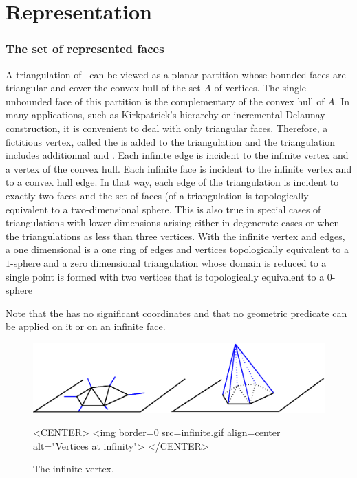 \section{Representation}
\label{Section_2D_Triangulations_Representation}

\subsubsection{The set of represented faces}

A triangulation  of \cgal\ can be viewed as a planar partition 
whose bounded faces are triangular and cover
the convex hull of the set ${  A}$ of vertices. 
The single unbounded face of this partition
is the complementary of the convex hull of ${  A}$. 
In many applications, such as Kirkpatrick's hierarchy
or incremental Delaunay construction, it is convenient to
deal with only triangular faces. Therefore, 
a fictitious vertex, called the 
is added to the triangulation and  the triangulation
includes additionnal  and .
Each infinite edge
is incident to the infinite vertex and a vertex of the convex hull.
Each infinite face is incident to the infinite vertex
and to a convex hull edge. 
 In that way, each edge of the triangulation
is incident to exactly two faces
and the set of faces (of a triangulation is topologically
equivalent to a two-dimensional sphere.
This is also true
in special cases of triangulations with lower dimensions
arising either in degenerate cases or when the triangulations
as less than three vertices.
With the infinite vertex and edges, a one dimensional 
is a one ring of edges and vertices
topologically equivalent to a $1$-sphere
and a zero dimensional triangulation whose domain is reduced to a
single point is formed with two vertices that is
topologically equivalent to a $0$-sphere

Note that
the  has no significant
coordinates and that no geometric predicate can be applied on it
or on an infinite face.

\begin{figure}
\begin{ccTexOnly}
\begin{center}
\includegraphics{infinite.eps} 
\end{center}
\end{ccTexOnly}
\caption{The infinite vertex.
\label{I1_Fig_infinite_vertex}}
\begin{ccHtmlOnly}
<CENTER>
<img border=0 src=infinite.gif align=center alt="Vertices at
infinity">
</CENTER>
\end{ccHtmlOnly}
\end{figure}




